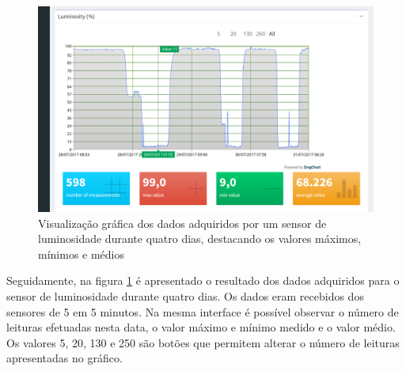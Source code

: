 \newpage

\begin{figure}[h]
	\centering
	\includegraphics[width=0.8\linewidth]{prints-web/humidity.png}
	\caption{Visualização gráfica dos dados adquiridos por um sensor de luminosidade durante quatro dias, destacando os valores máximos, mínimos e médios}
	\label{grafico_humidade}
\end{figure}



Seguidamente, na figura \ref{grafico_humidade} é apresentado o resultado dos dados adquiridos para o sensor de luminosidade durante quatro dias. Os dados eram recebidos dos sensores de 5 em 5 minutos. Na mesma interface é possível observar o número de leituras efetuadas nesta data, o valor máximo e mínimo medido e o valor médio. Os valores 5, 20, 130 e 250 são botões que permitem alterar o número de leituras apresentadas no gráfico. 
 

